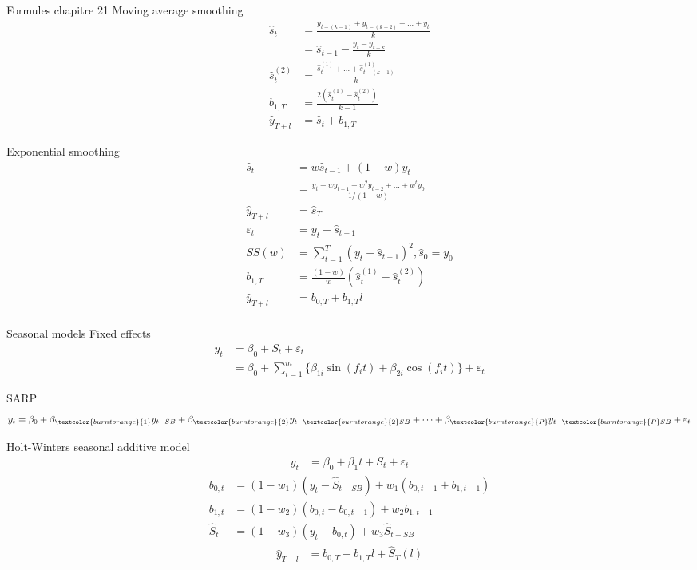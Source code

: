 \documentclass[12pt, titlepage, french]{report}
\begin{document}
\begin{FORMULA_SUMM}{Formules chapitre 21}
Moving average smoothing
\begin{align*}
	\hat{s}_{t}
		&=	\frac{y_{t - (k - 1)} + y_{t - (k - 2)} + \dots + y_{t}}{k}	\\
		&=	\hat{s}_{t - 1} - \frac{y_{t} - y_{t - k}}{k}	\\
	\hat{s}_{t}^{(2)}	
		&=	\frac{\hat{s}_{t}^{(1)} + \dots + \hat{s}_{t - (k - 1)}^{(1)}}{k}	\\
	b_{1, T}	
		&=	\frac{2(\hat{s}_{t}^{(1)} - \hat{s}_{t}^{(2)})}{k - 1}	\\
	\hat{y}_{T + l}
		&=	\hat{s}_{t} + b_{1, T}	
\end{align*}

Exponential smoothing
\begin{align*}
	\hat{s}_{t}
		&=	w \hat{s}_{t - 1} + (1 - w) y_{t}	\\
		&=	\frac{y_{t} + w y_{t - 1} + w^{2} y_{t - 2} + \dots + w^{t} y_{0}}{1/(1 - w)}	\\
	\hat{y}_{T + l}
		&=	\hat{s}_{T}		\\
	\varepsilon_{t}
		&=	y_{t} - \hat{s}_{t - 1}	\\
	SS(w)
		&=	\sum_{t = 1}^{T}(y_{t} - \hat{s}_{t - 1})^{2}, \hat{s}_{0} = y_{0}	\\
	b_{1, T}	
		&=	\frac{(1 - w)}{w}\left(\hat{s}_{t}^{(1)} - \hat{s}_{t}^{(2)}\right)	\\
	\hat{y}_{T + l}
		&=	b_{0, T} + b_{1, T} l	\\
\end{align*}

Seasonal models
Fixed effects
\begin{align*}
	y_{t}
		&=	\beta_{0} + S_t + \varepsilon_{t}	\\
		&=	\beta_{0} + \sum_{i = 1}^{m} \{ \beta_{1i} \sin(f_{i}t) + \beta_{2i} \cos(f_{i}t)	 \} + \varepsilon_{t} 
\end{align*}

SAR\textcolor{burntorange}{P}
\begin{align*}
	y_{t}
	&=	\beta_{0} + \beta_{\textcolor{burntorange}{1}}y_{t - SB} + \beta_{\textcolor{burntorange}{2}} y_{t - \textcolor{burntorange}{2}SB} + \dots + \beta_{\textcolor{burntorange}{P}} y_{t - \textcolor{burntorange}{P} SB} + \varepsilon_{t}	\\
\end{align*}

Holt-Winters seasonal additive model
\begin{align*}
	y_{t} 
	&= 	\beta_{0} + \beta_{1}t + S_{t} + \varepsilon_{t}
\end{align*}
\begin{align*}
	b_{0, t}	
	&=	(1 - w_{1}) (y_{t} - \hat{S}_{t - SB}) + w_{1} (b_{0, t - 1} +  b_{1, t - 1})	\\
	b_{1, t}	
	&=	(1 - w_{2}) (b_{0, t} - b_{0, t - 1}) + w_{2} b_{1, t - 1}	\\
	\hat{S}_{t}	
	&=	(1 - w_{3}) (y_{t} - b_{0, t}) + w_{3} \hat{S}_{t - SB}	
\end{align*}
\begin{align*}
	\hat{y}_{T + l}
	&=	b_{0, T} + b_{1, T} l + \hat{S}_{T}(l)
\end{align*}


\end{FORMULA_SUMM}
\end{document}
